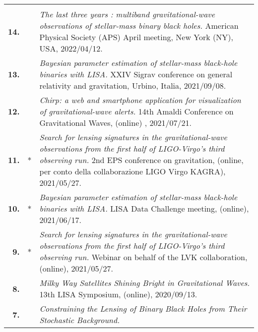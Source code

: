 {\begin{longtable}{rp{0.3cm}p{15.8cm}}
\vspace{0.05cm}\\
%
\textbf{14.} &  & \textit{The last three years : multiband gravitational-wave observations of stellar-mass binary black holes.}
\newline{}
American Physical Society (APS) April meeting, New York (NY), USA, 2022/04/12.
\vspace{0.05cm}\\
%
\textbf{13.} &  & \textit{Bayesian parameter estimation of stellar-mass black-hole binaries with LISA.}
\newline{}
XXIV Sigrav conference on general relativity and gravitation, Urbino, Italia, 2021/09/08.
\vspace{0.05cm}\\
%
\textbf{12.} &  & \textit{Chirp: a web and smartphone application for visualization of gravitational-wave alerts.}
\newline{}
14th Amaldi Conference on Gravitational Waves, (online) , 2021/07/21.
\vspace{0.05cm}\\
%
\textbf{11.} & * & \textit{Search for lensing signatures in the gravitational-wave observations from the first half of LIGO-Virgo’s third observing run.}
\newline{}
2nd EPS conference on gravitation, (online, per conto della collaborazione LIGO Virgo KAGRA), 2021/05/27.
\vspace{0.05cm}\\
%
\textbf{10.} & * & \textit{Bayesian parameter estimation of stellar-mass black-hole binaries with LISA.}
\newline{}
LISA Data Challenge meeting, (online), 2021/06/17.
\vspace{0.05cm}\\
%
\textbf{9.} & * & \textit{Search for lensing signatures in the gravitational-wave observations from the first half of LIGO-Virgo’s third observing run.}
\newline{}
Webinar on behalf of the LVK collaboration, (online), 2021/05/27.
\vspace{0.05cm}\\
%
\textbf{8.} &  & \textit{Milky Way Satellites Shining Bright in Gravitational Waves.}
\newline{}
13th LISA Symposium, (online), 2020/09/13.
\vspace{0.05cm}\\
%
\textbf{7.} &  & \textit{Constraining the Lensing of Binary Black Holes from Their Stochastic Background.}

\end{longtable}}
